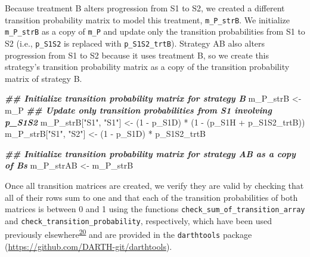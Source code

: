 \documentclass[
]{article}
\newenvironment{Shaded}{\begin{snugshade}}{\end{snugshade}}
\newcommand{\DecValTok}[1]{\textcolor[rgb]{0.00,0.00,0.81}{#1}}
\newcommand{\DocumentationTok}[1]{\textcolor[rgb]{0.56,0.35,0.01}{\textbf{\textit{#1}}}}
\newcommand{\NormalTok}[1]{#1}
\newcommand{\OtherTok}[1]{\textcolor[rgb]{0.56,0.35,0.01}{#1}}
\newcommand{\SpecialCharTok}[1]{\textcolor[rgb]{0.00,0.00,0.00}{#1}}
\newcommand{\StringTok}[1]{\textcolor[rgb]{0.31,0.60,0.02}{#1}}
\begin{document}
Because treatment B alters progression from S1 to S2, we created a different transition probability matrix to model this treatment, \texttt{m\_P\_strB}. We initialize \texttt{m\_P\_strB} as a copy of \texttt{m\_P} and update only the transition probabilities from S1 to S2 (i.e., \texttt{p\_S1S2} is replaced with \texttt{p\_S1S2\_trtB}). Strategy AB also alters progression from S1 to S2 because it uses treatment B, so we create this strategy's transition probability matrix as a copy of the transition probability matrix of strategy B.

\begin{Shaded}
\begin{Highlighting}[]
\DocumentationTok{\#\# Initialize transition probability matrix for strategy B}
\NormalTok{m\_P\_strB }\OtherTok{\textless{}{-}}\NormalTok{ m\_P}
\DocumentationTok{\#\# Update only transition probabilities from S1 involving p\_S1S2}
\NormalTok{m\_P\_strB[}\StringTok{"S1"}\NormalTok{, }\StringTok{"S1"}\NormalTok{] }\OtherTok{\textless{}{-}}\NormalTok{ (}\DecValTok{1} \SpecialCharTok{{-}}\NormalTok{ p\_S1D) }\SpecialCharTok{*}\NormalTok{ (}\DecValTok{1} \SpecialCharTok{{-}}\NormalTok{ (p\_S1H }\SpecialCharTok{+}\NormalTok{ p\_S1S2\_trtB))}
\NormalTok{m\_P\_strB[}\StringTok{"S1"}\NormalTok{, }\StringTok{"S2"}\NormalTok{] }\OtherTok{\textless{}{-}}\NormalTok{ (}\DecValTok{1} \SpecialCharTok{{-}}\NormalTok{ p\_S1D) }\SpecialCharTok{*}\NormalTok{ p\_S1S2\_trtB}

\DocumentationTok{\#\# Initialize transition probability matrix for strategy AB as a copy of B\textquotesingle{}s}
\NormalTok{m\_P\_strAB }\OtherTok{\textless{}{-}}\NormalTok{ m\_P\_strB}
\end{Highlighting}
\end{Shaded}

Once all transition matrices are created, we verify they are valid by checking that all of their rows sum to one and that each of the transition probabilities of both matrices is between 0 and 1 using the functions \texttt{check\_sum\_of\_transition\_array} and \texttt{check\_transition\_probability}, respectively, which have been used previously elsewhere\textsuperscript{\protect\hyperlink{ref-Alarid-Escudero2019e}{20}} and are provided in the \texttt{darthtools} package (\url{https://github.com/DARTH-git/darthtools}).
\end{document}
